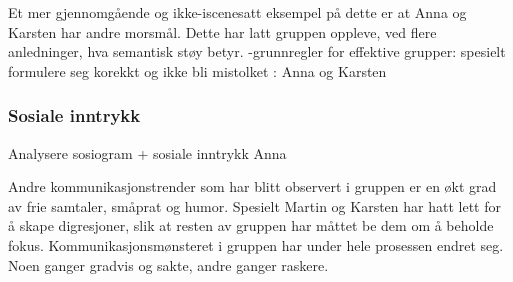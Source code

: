 Et mer gjennomgående og ikke-iscenesatt eksempel på dette er at Anna og Karsten har andre morsmål.
Dette har latt gruppen oppleve, ved flere anledninger, hva semantisk støy betyr.
 -grunnregler for effektive grupper: spesielt formulere seg korekkt og ikke bli mistolket : Anna og Karsten
 
\subsubsection{Sosiale inntrykk}

Analysere sosiogram + sosiale inntrykk Anna

Andre kommunikasjonstrender som har blitt observert i gruppen er en økt grad av frie samtaler, småprat og humor. Spesielt Martin og Karsten har hatt lett for å skape digresjoner, slik at resten av gruppen har måttet be dem om å beholde fokus. 
Kommunikasjonsmønsteret i gruppen har under hele prosessen endret seg.
Noen ganger gradvis og sakte, andre ganger raskere. 




























